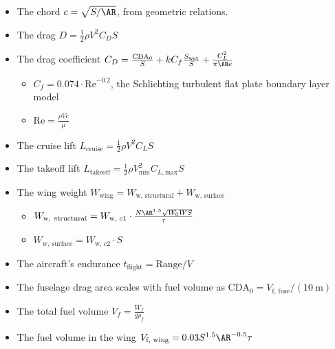 \begin{example}
    \begin{itemize}[noitemsep]
        \item The chord $c = \sqrt{S / \AR}$, from geometric relations.
        \item The drag $D = \frac{1}{2} \rho V^2 C_D S$
        \item The drag coefficient $C_D = \frac{\mathrm{CDA}_0}{S} + k C_f \frac{S_\text{wet}}{S} + \frac{C_L^2}{\pi \AR e}$
        \begin{itemize}[noitemsep]
            \item $C_f = 0.074 \cdot \text{Re}^{-0.2}$, the Schlichting turbulent flat plate boundary layer model
            \item $\text{Re} = \frac{\rho V c}{\mu}$
        \end{itemize}
        \item The cruise lift $L_\text{cruise}=\frac{1}{2}\rho V^2 C_L S$
        \item The takeoff lift $L_\text{takeoff}=\frac{1}{2}\rho V_\text{min}^2 C_{L, \text{max}} S$
        \item The wing weight $W_{\text{wing}}= W_\text{w, structural} + W_\text{w, surface}$
        \begin{itemize}[noitemsep]
            \item $W_\mathrm{w,\ structural} = W_\text{w, c1} \cdot \frac{N \AR^{1.5} \sqrt{W_0 W S}}{\tau}$
            \item $W_\mathrm{w,\ surface} = W_\text{w, c2} \cdot S$
        \end{itemize}
        \item The aircraft's endurance $t_\text{flight} = \text{Range} / V$
        \item The fuselage drag area scales with fuel volume as $\text{CDA}_0 = V_\text{f, fuse} / (10\ \si{\meter})$
        \item The total fuel volume $V_f = \frac{W_f}{g\rho_f}$
        \item The fuel volume in the wing $V_\text{f, wing} = 0.03 S^{1.5} \AR^{-0.5} \tau$
    \end{itemize}


\end{example}
